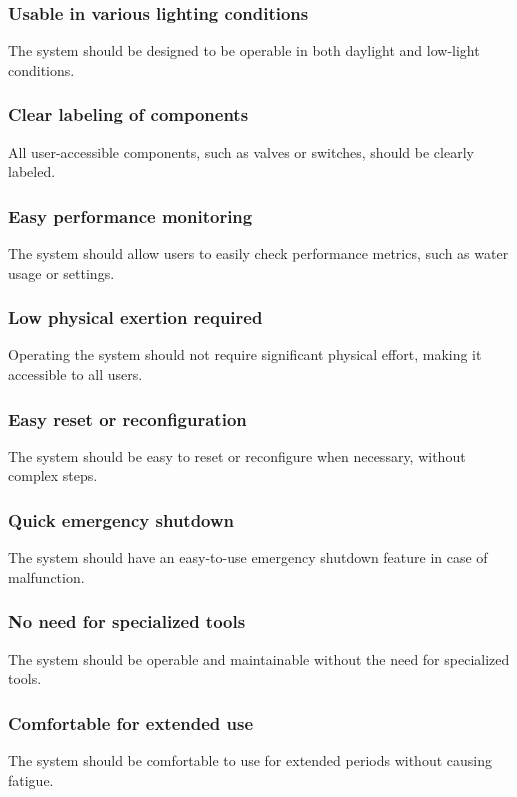 \documentclass[11pt]{article}
\begin{document}
\subsubsection{Usable in various lighting conditions}
The system should be designed to be operable in both daylight and low-light conditions.

\subsubsection{Clear labeling of components}
All user-accessible components, such as valves or switches, should be clearly labeled.

\subsubsection{Easy performance monitoring}
The system should allow users to easily check performance metrics, such as water usage or settings.

\subsubsection{Low physical exertion required}
Operating the system should not require significant physical effort, making it accessible to all users.

\subsubsection{Easy reset or reconfiguration}
The system should be easy to reset or reconfigure when necessary, without complex steps.

\subsubsection{Quick emergency shutdown}
The system should have an easy-to-use emergency shutdown feature in case of malfunction.

\subsubsection{No need for specialized tools}
The system should be operable and maintainable without the need for specialized tools.

\subsubsection{Comfortable for extended use}
The system should be comfortable to use for extended periods without causing fatigue.
\end{document}
